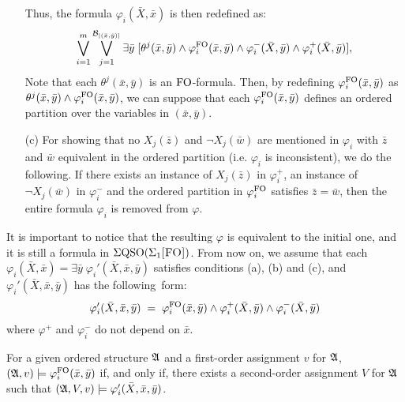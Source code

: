 \begin{itemize}
	Thus, the formula $\varphi_i(\bar{X},\bar{x})$ is then redefined as:
	$$
	\bigvee_{i = 1}^m \bigvee_{j = 1}^{\mathcal{B}_{\vert (\bar{x},\bar{y}) \vert}} \exists \bar{y} \; [\theta^j(\bar{x},\bar{y})\wedge \varphi_i^{{\rm FO}}(\bar{x},\bar{y}) \wedge \varphi_i^{-}(\bar{X},\bar{y}) \wedge \varphi_i^{+}(\bar{X},\bar{y})],
	$$
	Note that each $\theta^j(\bar{x},\bar{y})$ is an ${\rm FO}$-formula.
	Then, by redefining $\varphi_i^{{\rm FO}}(\bar{x},\bar{y})$  as $\theta^j(\bar{x},\bar{y})\wedge \varphi_i^{{\rm FO}}(\bar{x},\bar{y})$, we can suppose that each $\varphi_i^{{\rm FO}}(\bar{x},\bar{y})$ defines an ordered partition over the variables in $(\bar{x},\bar{y})$.
	\item[(c)] For showing that no $X_j(\bar{z})$ and $\neg X_j(\bar{w})$ are mentioned in $\varphi_i$ with $\bar{z}$ and $\bar{w}$ equivalent in the ordered partition (i.e. $\varphi_i$ is inconsistent), we do the following. If there exists an instance of $X_j(\bar{z})$ in $\varphi^{+}_i$, an instance of $\neg X_j(\bar{w})$ in $\varphi^{-}_i$ and the ordered partition in $\varphi^{{\rm FO}}_i$ satisfies $\bar{z} = \bar{w}$, then the entire formula $\varphi_i$ is removed from $\varphi$.
\end{itemize}
It is important to notice that the resulting $\varphi$ is equivalent to the initial one, and it is still a formula in $\Sigma{\rm QSO}(\Sigma_{1}\textsc{[FO]})$. From now on, we assume that each $\varphi_i(\bar{X},\bar{x}) = \exists \bar{y} \;  \varphi_i'(\bar{X},\bar{x}, \bar{y}) $ satisfies conditions (a), (b) and (c), and $\varphi_i'(\bar{X},\bar{x}, \bar{y})$ has the following~form:
$$
\varphi_i'(\bar{X},\bar{x}, \bar{y}) \; = \; \varphi^{{\rm FO}}_i(\bar{x},\bar{y}) \wedge \varphi^{+}_i(\bar{X}, \bar{y}) \wedge \varphi^{-}_i(\bar{X},\bar{y}) 
$$
where $\varphi^{+}$ and $\varphi^{-}_i$ do not depend on  $\bar{x}$.
\begin{claim}\label{claim:minusone}
For a given ordered structure $\mathfrak{A}$ and a first-order assignment $v$ for $\mathfrak{A}$, $(\mathfrak{A},v)\models\varphi^{{\rm FO}}_i(\bar{x},\bar{y})$ if, and only if, there exists a second-order assignment $V$ for $\mathfrak{A}$ such that $(\mathfrak{A},V,v)\models \varphi_i'(\bar{X},\bar{x}, \bar{y})$.
\end{claim}
